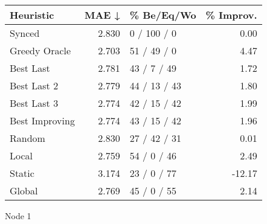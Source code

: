 \begin{tabular}{lrlr}
\toprule
\textbf{Heuristic} & \textbf{MAE ↓} & \textbf{\% Be/Eq/Wo} & \textbf{\% Improv.} \\
\midrule
            Synced &          2.830 &          0 / 100 / 0 &                0.00 \\
     Greedy Oracle &          2.703 &          51 / 49 / 0 &                4.47 \\
         Best Last &          2.781 &          43 / 7 / 49 &                1.72 \\
       Best Last 2 &          2.779 &         44 / 13 / 43 &                1.80 \\
       Best Last 3 &          2.774 &         42 / 15 / 42 &                1.99 \\
    Best Improving &          2.774 &         43 / 15 / 42 &                1.96 \\
            Random &          2.830 &         27 / 42 / 31 &                0.01 \\
             Local &          2.759 &          54 / 0 / 46 &                2.49 \\
            Static &          3.174 &          23 / 0 / 77 &              -12.17 \\
            Global &          2.769 &          45 / 0 / 55 &                2.14 \\
\bottomrule
\end{tabular}
\caption{Node 1}
\label{tab:ds_non_lr05_le1_bs2_1}
